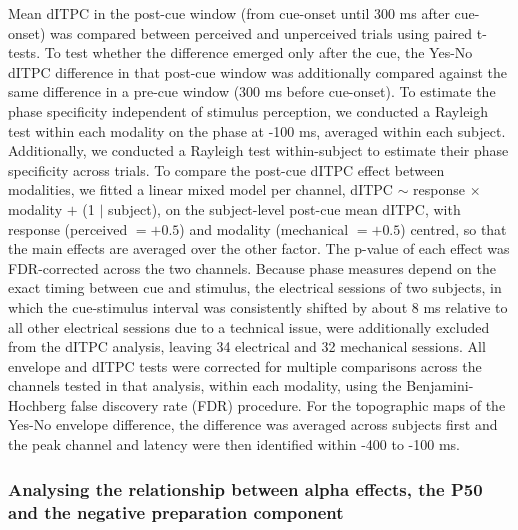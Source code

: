 \documentclass[11pt,a4paper,onecolumn]{article}
\begin{document}
Mean dITPC in the post-cue window (from cue-onset until 300 ms after cue-onset) was compared between perceived and unperceived trials using paired t-tests. To test whether the difference emerged only after the cue, the Yes-No dITPC difference in that post-cue window was additionally compared against the same difference in a pre-cue window (300 ms before cue-onset).  To estimate the phase specificity independent of stimulus perception, we conducted a Rayleigh test within each modality on the phase at -100 ms, averaged within each subject. Additionally, we conducted a Rayleigh test within-subject to estimate their phase specificity across trials. To compare the post-cue dITPC effect between modalities, we fitted a linear mixed model per channel, dITPC $\sim$ response $\times$ modality $+$ (1 $|$ subject), on the subject-level post-cue mean dITPC, with response (perceived $= +0.5$) and modality (mechanical $= +0.5$) centred, so that the main effects are averaged over the other factor. The p-value of each effect was FDR-corrected across the two channels. Because phase measures depend on the exact timing between cue and stimulus, the electrical sessions of two subjects, in which the cue-stimulus interval was consistently shifted by about 8 ms relative to all other electrical sessions due to a technical issue, were additionally excluded from the dITPC analysis, leaving 34 electrical and 32 mechanical sessions.
All envelope and dITPC tests were corrected for multiple comparisons across the channels tested in that analysis, within each modality, using the Benjamini-Hochberg false discovery rate (FDR) procedure. For the topographic maps of the Yes-No envelope difference, the difference was averaged across subjects first and the peak channel and latency were then identified within -400 to -100 ms.

\subsubsection*{Analysing the relationship between alpha effects, the P50 and the negative preparation component}
\vspace{-7pt}
\end{document}
